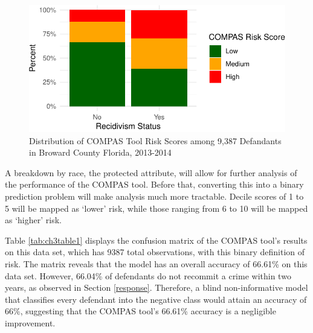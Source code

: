\documentclass[12pt, twoside]{amherstthesis}
\begin{document}
\begin{figure}

{\centering \includegraphics{Dasha-Asienga_StatThesis_files/figure-latex/ch3fig9-1} 

}

\caption{Distribution of COMPAS Tool Risk Scores among 9,387 Defandants in Broward County Florida, 2013-2014}\label{fig:ch3fig9}
\end{figure}
A breakdown by race, the protected attribute, will allow for further analysis of the performance of the COMPAS tool. Before that, converting this into a binary prediction problem will make analysis much more tractable. Decile scores of 1 to 5 will be mapped as `lower' risk, while those ranging from 6 to 10 will be mapped as `higher' risk.

Table \ref{tab:ch3table1} displays the confusion matrix of the COMPAS tool's results on this data set, which has 9387 total observations, with this binary definition of risk. The matrix reveals that the model has an overall accuracy of 66.61\% on this data set. However, 66.04\% of defendants do not recommit a crime within two years, as observed in Section \ref{response}. Therefore, a blind non-informative model that classifies every defendant into the negative class would attain an accuracy of 66\%, suggesting that the COMPAS tool's 66.61\% accuracy is a negligible improvement.
\end{document}
